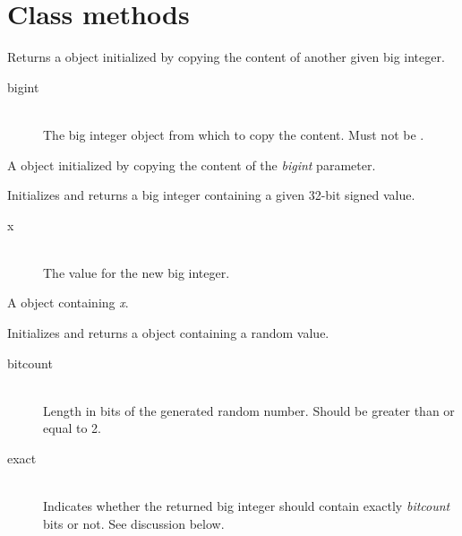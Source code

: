 \section{Class methods}



Returns a  object initialized by copying the content of another given big integer.


\docparams

\begin{description}
\item[bigint] \hfill \\ The big integer object from which to copy the content. Must not be .
\end{description}

\docretval

A  object initialized by copying the content of the \emph{bigint} parameter.



Initializes and returns a big integer containing a given 32-bit signed value.


\docparams

\begin{description}
\item[x] \hfill \\ The value for the new big integer.
\end{description}

\docretval

A  object containing \emph{x}.



Initializes and returns a  object containing a random value.


\docparams

\begin{description}
\item[bitcount] \hfill \\ Length in bits of the generated random number. Should be greater than or equal to 2.
\item[exact] \hfill \\ Indicates whether the returned big integer should contain exactly \emph{bitcount} bits or not. See discussion below.
\end{description}

